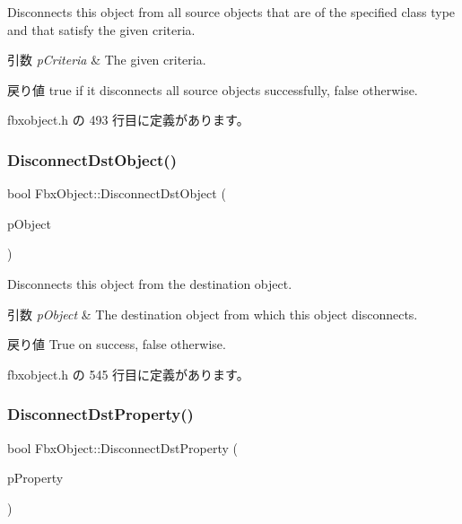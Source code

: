 Disconnects this object from all source objects that are of the specified class type and that satisfy the given criteria. 
\begin{DoxyParams}{引数}
{\em p\+Criteria} & The given criteria. \\
\hline
\end{DoxyParams}
\begin{DoxyReturn}{戻り値}
{\ttfamily true} if it disconnects all source objects successfully, {\ttfamily false} otherwise. 
\end{DoxyReturn}


 fbxobject.\+h の 493 行目に定義があります。

\mbox{\label{class_fbx_object_a949fdf817b27505861f293cea4dc3b86}} 
\subsubsection{\texorpdfstring{Disconnect\+Dst\+Object()}{DisconnectDstObject()}}
{\footnotesize\ttfamily bool Fbx\+Object\+::\+Disconnect\+Dst\+Object (\begin{DoxyParamCaption}\item[{\hyperlink{class_fbx_object}{Fbx\+Object} $\ast$}]{p\+Object }\end{DoxyParamCaption})\hspace{0.3cm}{\ttfamily [inline]}}

Disconnects this object from the destination object. 
\begin{DoxyParams}{引数}
{\em p\+Object} & The destination object from which this object disconnects. \\
\hline
\end{DoxyParams}
\begin{DoxyReturn}{戻り値}
{\ttfamily True} on success, {\ttfamily false} otherwise. 
\end{DoxyReturn}


 fbxobject.\+h の 545 行目に定義があります。

\mbox{\label{class_fbx_object_a0931b1e490684c4ff0532d69a466b4b2}} 
\subsubsection{\texorpdfstring{Disconnect\+Dst\+Property()}{DisconnectDstProperty()}}
{\footnotesize\ttfamily bool Fbx\+Object\+::\+Disconnect\+Dst\+Property (\begin{DoxyParamCaption}\item[{const \hyperlink{class_fbx_property}{Fbx\+Property} \&}]{p\+Property }\end{DoxyParamCaption})\hspace{0.3cm}{\ttfamily [inline]}}

